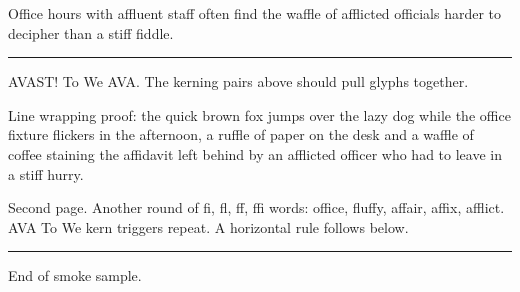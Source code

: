 
Office hours with affluent staff often find the waffle of afflicted
officials harder to decipher than a stiff fiddle.

\hrule

AVAST! To We AVA. The kerning pairs above should pull glyphs together.

Line wrapping proof: the quick brown fox jumps over the lazy dog while
the office fixture flickers in the afternoon, a ruffle of paper on the
desk and a waffle of coffee staining the affidavit left behind by an
afflicted officer who had to leave in a stiff hurry.

\eject

Second page. Another round of fi, fl, ff, ffi words: office, fluffy,
affair, affix, afflict. AVA To We kern triggers repeat. A horizontal
rule follows below.

\hrule

End of smoke sample.
\bye
